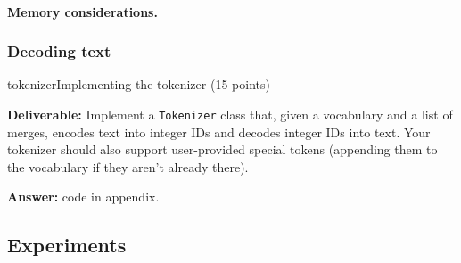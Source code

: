 \paragraph{Memory considerations.} \vspace{-1em}

\subsubsection{Decoding text}

\begin{problembox}{tokenizer}{Implementing the tokenizer (15 points)}

    \qquad \textbf{Deliverable:} Implement a \texttt{Tokenizer} class that, given a vocabulary and a list of merges, encodes text into integer IDs and decodes integer IDs into text. Your tokenizer should also support user-provided special tokens (appending them to the vocabulary if they aren't already there).

    \qquad \textbf{Answer:} code in appendix.

\end{problembox}

\subsection{Experiments}


